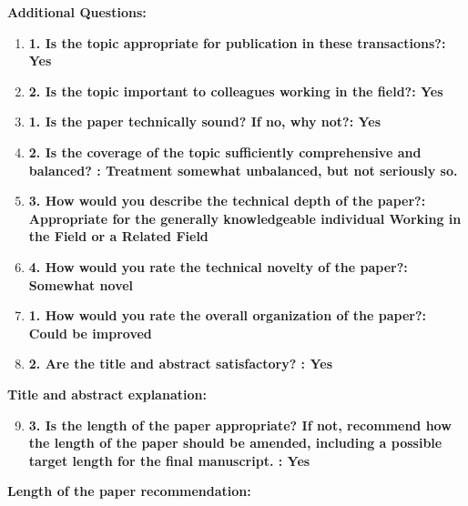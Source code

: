 \documentclass[12pt]{article}
\begin{document}
\textbf{Additional Questions:}

\begin{enumerate}

\item \textbf{1. Is the topic appropriate for publication in these transactions?: Yes}

\item \textbf{2. Is the topic important to colleagues working in the field?: Yes}

\item \textbf{1. Is the paper technically sound? If no, why not?: Yes}


\item \textbf{2. Is the coverage of the topic sufficiently comprehensive and balanced? : 
Treatment somewhat unbalanced, but not seriously so.}

\item \textbf{3. How would you describe the technical depth of the paper?: Appropriate 
for the generally knowledgeable individual Working in the Field or a Related Field}

\item \textbf{4. How would you rate the technical novelty of the paper?: Somewhat novel}

\item \textbf{1. How would you rate the overall organization of the paper?: Could be 
improved}

\item \textbf{2. Are the title and abstract satisfactory? : Yes}

\end{enumerate}

\textbf{Title and abstract explanation:}


\begin{enumerate}
\setcounter{enumi}{8}
\item \textbf{3. Is the length of the paper appropriate? If not, recommend how the length 
of the paper should be amended, including a possible target length for the final 
manuscript. : Yes}

\end{enumerate}


\textbf{Length of the paper recommendation:}
\end{document}

